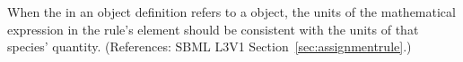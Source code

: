 When the  in an \AssignmentRule object definition refers to
a \Species object, the units of the mathematical expression in the rule's
 element should be consistent with the units of that species'
quantity.  (References: SBML L3V1 Section~\ref{sec:assignmentrule}.)
